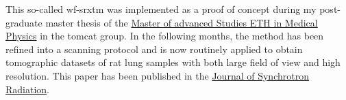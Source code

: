 This so-called \ac{wf-srxtm} was implemented as a proof of concept during my post-graduate master thesis of the \href{http://www.biomed.ee.ethz.ch/nds/}{Master of advanced Studies ETH in Medical Physics} in the \ac{tomcat} group. In the following months, the method has been refined into a scanning protocol and is now routinely applied to obtain tomographic datasets of rat lung samples with both large field of view and high resolution. This paper has been published in the \href{http://journals.iucr.org/s/}{Journal of Synchrotron Radiation}.